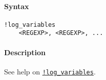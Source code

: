 


	\paragraph{Syntax}\label{syntax}

\begin{verbatim}
!log_variables
    <REGEXP>, <REGEXP>, ...
\end{verbatim}

\paragraph{Description}\label{description}

See help on \href{modellang/logvariables}{\texttt{!log\_variables}}.


